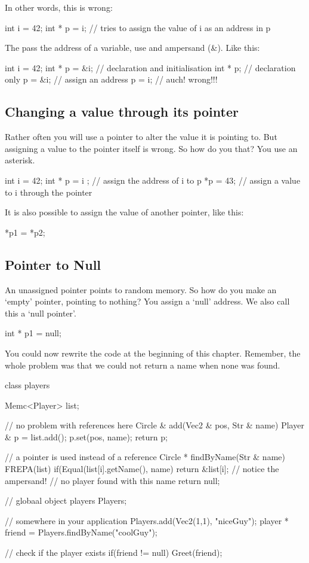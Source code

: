 In other words, this is wrong:
\begin{code}
int i = 42;
int * p = i; // tries to assign the value of i as an address in p
\end{code}

The pass the address of a variable, use and ampersand (\&). Like this:

\begin{code}
int   i = 42;
int * p = &i; // declaration and initialisation
int * p;      // declaration only
p       = &i; // assign an address
p       =  i; // auch! wrong!!! 
\end{code}    


\subsection{Changing a value through its pointer}
Rather often you will use a pointer to alter the value it is pointing to. But assigning a value to the pointer itself is wrong. So how do you that? You use an asterisk.

\begin{code}
int   i = 42;
int * p = i ; // assign the address of i to p
*p      = 43; // assign a value to i through the pointer
\end{code}

It is also possible to assign the value of another pointer, like this:

\begin{code}
*p1 = *p2;
\end{code}

\subsection{Pointer to Null}
An unassigned pointer points to random memory. So how do you make an `empty' pointer, pointing to nothing? You assign a `null' address. We also call this a `null pointer'.

\begin{code}
int * p1 = null;
\end{code}

You could now rewrite the code at the beginning of this chapter. Remember, the whole problem was that we could not return a name when none was found.

\begin{code}
class players {
  Memc<Player> list;
  
  // no problem with references here
  Circle &  add(Vec2 & pos, Str & name) {
    Player & p = list.add();
    p.set(pos, name);
    return p;
  }	  

  // a pointer is used instead of a reference
  Circle * findByName(Str & name) {
    FREPA(list) {
      if(Equal(list[i].getName(), name) {
        return &list[i]; // notice the ampersand!
      }
    }
    // no player found with this name
    return null;
  }	
}
// globaal object
players Players;

// somewhere in your application
Players.add(Vec2(1,1), "niceGuy");
player * friend = Players.findByName("coolGuy");

// check if the player exists
if(friend != null) {
  Greet(friend);
}
\end{code} 

